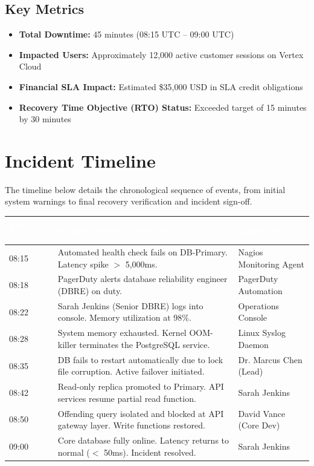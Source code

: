 \documentclass[11pt,a4paper]{article}
\begin{document}
\subsection{Key Metrics}
\begin{itemize}[label=\textcolor{SecondaryColor}{\tiny\faCircle}, leftmargin=15pt, nosep]
  \item \textbf{Total Downtime:} 45 minutes (08:15 UTC -- 09:00 UTC)
  \item \textbf{Impacted Users:} Approximately 12,000 active customer sessions on Vertex Cloud
  \item \textbf{Financial SLA Impact:} Estimated \$35,000 USD in SLA credit obligations
  \item \textbf{Recovery Time Objective (RTO) Status:} Exceeded target of 15 minutes by 30 minutes
\end{itemize}

\vspace{0.3cm}

\section{Incident Timeline}
The timeline below details the chronological sequence of events, from initial system warnings to final recovery verification and incident sign-off.

\begin{tabularx}{\textwidth}{>{\raggedright\arraybackslash\small}p{2.2cm} X >{\raggedright\arraybackslash\small}p{3.2cm}}
  \hline
  \rowcolor{PrimaryColor}
  \textcolor{white}{\textbf{Time (UTC)}} & \textcolor{white}{\textbf{Incident Event / Observation}} & \textcolor{white}{\textbf{Logged By}} \\
  \hline
  08:15 & Automated health check fails on DB-Primary. Latency spike $>$ 5,000ms. & Nagios Monitoring Agent \\
  \rowcolor{LightNeutral}
  08:18 & PagerDuty alerts database reliability engineer (DBRE) on duty. & PagerDuty Automation \\
  08:22 & Sarah Jenkins (Senior DBRE) logs into console. Memory utilization at 98\%. & Operations Console \\
  \rowcolor{LightNeutral}
  08:28 & System memory exhausted. Kernel OOM-killer terminates the PostgreSQL service. & Linux Syslog Daemon \\
  08:35 & DB fails to restart automatically due to lock file corruption. Active failover initiated. & Dr. Marcus Chen (Lead) \\
  \rowcolor{LightNeutral}
  08:42 & Read-only replica promoted to Primary. API services resume partial read function. & Sarah Jenkins \\
  08:50 & Offending query isolated and blocked at API gateway layer. Write functions restored. & David Vance (Core Dev) \\
  \rowcolor{LightNeutral}
  09:00 & Core database fully online. Latency returns to normal ($<$ 50ms). Incident resolved. & Sarah Jenkins \\
  \hline
\end{tabularx}
\end{document}
